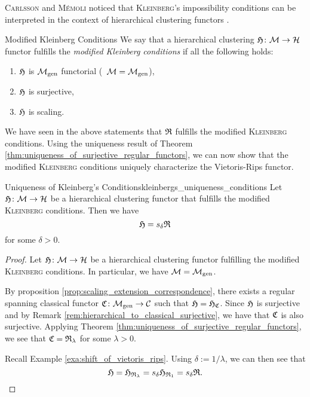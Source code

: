 \textsc{Carlsson} and \textsc{M\'emoli} noticed that \textsc{Kleinberg}'s impossibility conditions can be interpreted in the context of hierarchical clustering functors \cite[Sec.~7.3.1]{Carlsson2010}.

\begin{definition}{Modified Kleinberg Conditions \cite[Sec.~7.3.1]{Carlsson2010}}{}
    We say that a hierarchical clustering $\mathfrak{H}\colon \mathcal{M} \to \mathcal{H}$ functor fulfills the \emph{modified Kleinberg conditions} if all the following holds:
    \begin{enumerate}
        \item $\mathfrak{H}$ is ${\mathcal{M}_\mathrm{gen}}$ functorial (\ie\ $\mathcal{M} = {\mathcal{M}_\mathrm{gen}}$),
        \item $\mathfrak{H}$ is surjective,
        \item $\mathfrak{H}$ is scaling.
    \end{enumerate}
\end{definition}

We have seen in the above statements that $\mathfrak{R}$ fulfills the modified \textsc{Kleinberg} conditions.
Using the uniqueness result of Theorem \ref{thm:uniqueness_of_surjective_regular_functors}, we can now show that the modified \textsc{Kleinberg} conditions uniquely characterize the Vietoris-Rips functor.

\begin{theorem}{Uniqueness of Kleinberg's Conditions}{kleinbergs_uniqueness_conditions}
    Let $\mathfrak{H}\colon \mathcal{M} \to \mathcal{H}$ be a hierarchical clustering functor that fulfills the modified \textsc{Kleinberg} conditions. Then we have
    $$
    \mathfrak{H} = s_\delta \mathfrak{R}
    $$
    for some $\delta > 0$.
\end{theorem}

\begin{proof}
Let $\mathfrak{H}\colon \mathcal{M} \to \mathcal{H}$ be a hierarchical clustering functor fulfilling the modified \textsc{Kleinberg} conditions. In particular, we have $\mathcal{M} = {\mathcal{M}_\mathrm{gen}}$.

By proposition \ref{prop:scaling_extension_correspondence}, there exists a regular spanning classical functor ${\mathfrak{C}\colon {\mathcal{M}_\mathrm{gen}} \to \mathcal{C}}$ such that $\mathfrak{H} = \mathfrak{H}_{\mathfrak{C}}$.
Since $\mathfrak{H}$ is surjective and by Remark \ref{rem:hierarchical_to_classical_surjective}, we have that $\mathfrak{C}$ is also surjective.
Applying Theorem \ref{thm:uniqueness_of_surjective_regular_functors}, we see that $\mathfrak{C} = \mathfrak{R}_{\lambda}$ for some $\lambda > 0$.


Recall Example \ref{exa:shift_of_vietoris_rips}. Using $\delta := 1/\lambda$, we can then see that
$$
\mathfrak{H} = \mathfrak{H}_{\mathfrak{R}_\lambda} = s_\delta \mathfrak{H}_{\mathfrak{R}_1} = s_\delta \mathfrak{R}.
$$
\end{proof}
